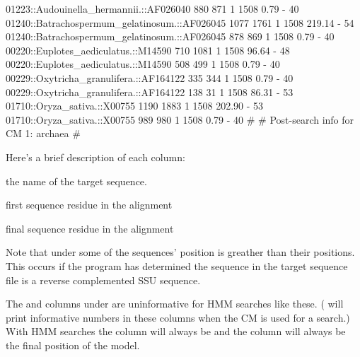 \begin{sreoutputtiny}
  01223::Audouinella_hermannii.::AF026040               880         871      1   1508      0.79         -   40
  01240::Batrachospermum_gelatinosum.::AF026045        1077        1761      1   1508    219.14         -   54
  01240::Batrachospermum_gelatinosum.::AF026045         878         869      1   1508      0.79         -   40
  00220::Euplotes_aediculatus.::M14590                  710        1081      1   1508     96.64         -   48
  00220::Euplotes_aediculatus.::M14590                  508         499      1   1508      0.79         -   40
  00229::Oxytricha_granulifera.::AF164122               335         344      1   1508      0.79         -   40
  00229::Oxytricha_granulifera.::AF164122               138          31      1   1508     86.31         -   53
  01710::Oryza_sativa.::X00755                         1190        1883      1   1508    202.90         -   53
  01710::Oryza_sativa.::X00755                          989         980      1   1508      0.79         -   40
#
# Post-search info for CM 1: archaea
#
\end{sreoutputtiny}

Here's a brief description of each column:

\begin{wideitem}
\item[\emprog{target name}] the name of the target sequence.

\item[\emprog{start (target coord)}] first sequence residue in the alignment

\item[\emprog{end (target coord)}] final sequence residue in the alignment
\end{wideitem}

Note that under  some of the sequences'  position is
greather than their  positions. This occurs if the program
has determined the sequence in the target sequence file is a reverse
complemented SSU sequence. 

The  and  columns under  are
uninformative for HMM searches like these.
( will print informative numbers in
these columns when the CM is used for a search.) With HMM searches the
 column will always be  and the  column
will always be the final position of the model.

